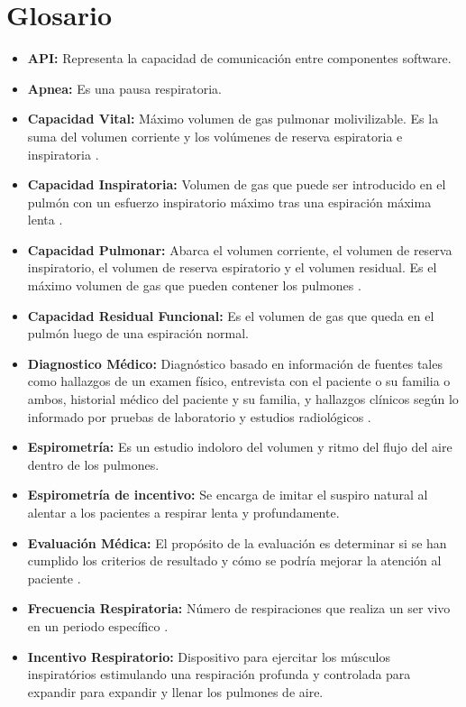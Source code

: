 \documentclass[12pt]{article}
\begin{document}
\section*{Glosario}
\begin{itemize}

\item \textbf{API:} Representa la capacidad de comunicación entre componentes software.
\item \textbf{Apnea:} Es una pausa respiratoria.
\item \textbf{Capacidad Vital:} Máximo volumen de gas pulmonar molivilizable. Es la suma del volumen corriente y los volúmenes de reserva espiratoria e inspiratoria \cite{19}. 
\item \textbf{Capacidad Inspiratoria:} Volumen de gas que puede ser introducido en el pulmón con un esfuerzo inspiratorio máximo tras una espiración máxima lenta \cite{19}.
\item \textbf{Capacidad Pulmonar:} Abarca el volumen corriente, el volumen de reserva inspiratorio, el volumen de reserva espiratorio y el volumen residual. Es el máximo volumen de gas que pueden contener los pulmones \cite{19}.
\item \textbf{Capacidad Residual Funcional:} Es el volumen de gas que queda en el pulmón luego de una espiración normal\cite{19}.
\item \textbf{Diagnostico Médico:} Diagnóstico basado en información de fuentes tales como hallazgos de un examen físico, entrevista con el paciente o su familia o ambos, historial médico del paciente y su familia, y hallazgos clínicos según lo informado por pruebas de laboratorio y estudios radiológicos \cite{4}.
\item \textbf{Espirometría:} Es un estudio indoloro del volumen y ritmo del flujo del aire dentro de los pulmones.
\item \textbf{Espirometría de incentivo:} Se encarga de imitar el suspiro natural al alentar a los pacientes a respirar lenta y profundamente.
\item \textbf{Evaluación Médica:} El propósito de la evaluación es determinar si se han cumplido los criterios de resultado y cómo se podría mejorar la atención al paciente \cite{4}.

\item \textbf{Frecuencia Respiratoria:} Número de respiraciones que realiza un ser vivo en un periodo específico \cite{1}. 


\item \textbf{Incentivo Respiratorio:} Dispositivo para ejercitar los músculos inspiratórios estimulando una respiración profunda y controlada para expandir para expandir y llenar los pulmones de aire.



\end{itemize}
\end{document}
